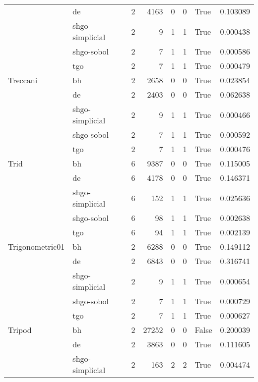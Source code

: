 \begin{longtable}{llrrrrlr}
         & de &     2 &     4163 &      0 &       0 &    True &    0.103089 \\
         & shgo-simplicial &     2 &        9 &      1 &       1 &    True &    0.000438 \\
         & shgo-sobol &     2 &        7 &      1 &       1 &    True &    0.000586 \\
         & tgo &     2 &        7 &      1 &       1 &    True &    0.000479 \\
Treccani & bh &     2 &     2658 &      0 &       0 &    True &    0.023854 \\
         & de &     2 &     2403 &      0 &       0 &    True &    0.062638 \\
         & shgo-simplicial &     2 &        9 &      1 &       1 &    True &    0.000466 \\
         & shgo-sobol &     2 &        7 &      1 &       1 &    True &    0.000592 \\
         & tgo &     2 &        7 &      1 &       1 &    True &    0.000476 \\
Trid & bh &     6 &     9387 &      0 &       0 &    True &    0.115005 \\
         & de &     6 &     4178 &      0 &       0 &    True &    0.146371 \\
         & shgo-simplicial &     6 &      152 &      1 &       1 &    True &    0.025636 \\
         & shgo-sobol &     6 &       98 &      1 &       1 &    True &    0.002638 \\
         & tgo &     6 &       94 &      1 &       1 &    True &    0.002139 \\
Trigonometric01 & bh &     2 &     6288 &      0 &       0 &    True &    0.149112 \\
         & de &     2 &     6843 &      0 &       0 &    True &    0.316741 \\
         & shgo-simplicial &     2 &        9 &      1 &       1 &    True &    0.000654 \\
         & shgo-sobol &     2 &        7 &      1 &       1 &    True &    0.000729 \\
         & tgo &     2 &        7 &      1 &       1 &    True &    0.000627 \\
Tripod & bh &     2 &    27252 &      0 &       0 &   False &    0.200039 \\
         & de &     2 &     3863 &      0 &       0 &    True &    0.111605 \\
         & shgo-simplicial &     2 &      163 &      2 &       2 &    True &    0.004474 \\

\end{longtable}
